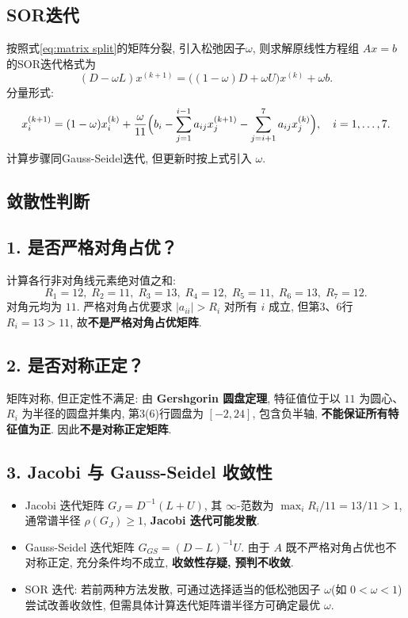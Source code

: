 \documentclass[12pt,a4paper]{ctexart}
\begin{document}
\subsection{SOR迭代}
按照式\eqref{eq:matrix split}的矩阵分裂, 引入松弛因子$\omega$, 则求解原线性方程组 $Ax=b$ 的SOR迭代格式为
\[
(D - \omega L)x^{(k+1)} = \bigl((1-\omega)D + \omega U\bigr)x^{(k)} + \omega b.
\]
分量形式: 
\[
x_i^{(k+1)} = (1-\omega)x_i^{(k)} + \frac{\omega}{11}\Bigl(b_i - \sum_{j=1}^{i-1} a_{ij}x_j^{(k+1)} - \sum_{j=i+1}^{7} a_{ij}x_j^{(k)}\Bigr), \quad i=1,\dots,7.
\]
计算步骤同Gauss-Seidel迭代, 但更新时按上式引入 $\omega$. 
\subsection{敛散性判断}
\subsection*{1. 是否严格对角占优？}
计算各行非对角线元素绝对值之和: 
\[
R_1=12,\; R_2=11,\; R_3=13,\; R_4=12,\; R_5=11,\; R_6=13,\; R_7=12.
\]
对角元均为 $11$. 严格对角占优要求 $|a_{ii}|>R_i$ 对所有 $i$ 成立, 但第3、6行 $R_i=13>11$, 故\textbf{不是严格对角占优矩阵}. 

\subsection*{2. 是否对称正定？}
矩阵对称, 但正定性不满足: 由 \textbf{Gershgorin 圆盘定理}, 特征值位于以 $11$ 为圆心、$R_i$ 为半径的圆盘并集内, 第3(6)行圆盘为 $[-2,24]$, 包含负半轴, \textbf{不能保证所有特征值为正}. 因此\textbf{不是对称正定矩阵}. 

\subsection*{3. Jacobi 与 Gauss-Seidel 收敛性}
\begin{itemize}
\item Jacobi 迭代矩阵 $G_J = D^{-1}(L+U)$, 其 $\infty$-范数为 $\max_i R_i/11 = 13/11 >1$, 通常谱半径 $\rho(G_J)\ge 1$, \textbf{Jacobi 迭代可能发散}. 
\item Gauss-Seidel 迭代矩阵 $G_{GS} = (D-L)^{-1}U$. 由于 $A$ 既不严格对角占优也不对称正定, 充分条件均不成立, \textbf{收敛性存疑, 预判不收敛}. 
\item SOR 迭代: 若前两种方法发散, 可通过选择适当的低松弛因子 $\omega$(如 $0<\omega<1$)尝试改善收敛性, 但需具体计算迭代矩阵谱半径方可确定最优 $\omega$. 
\end{itemize}
\end{document}
